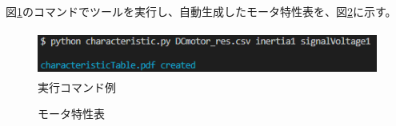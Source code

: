 図\ref{fig:zikkou}のコマンドでツールを実行し、自動生成したモータ特性表を、図\ref{fig:tokuseihyou}に示す。
\begin{figure}[t]
	\centering
	\includegraphics[width=12cm,height=1.5cm]{./Image/succes_comand.png}
	\caption{実行コマンド例}
	\label{fig:zikkou}
\end{figure}
\begin{figure}[t]
	\centering
	\caption{モータ特性表}
	\label{fig:tokuseihyou}
\end{figure}
